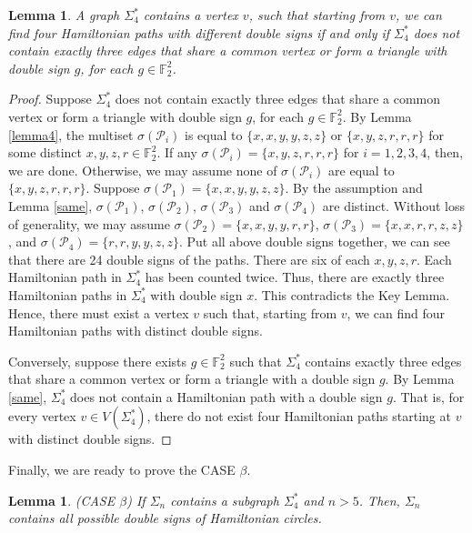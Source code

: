 \documentclass[12pt]{amsart}
\theoremstyle{plain}
\newtheorem{lemma}[theorem]{Lemma}
\theoremstyle{definition}%
\begin{document}
\begin{lemma}\label{thm11}
A graph $\Sigma_4^*$  contains a vertex $v$, such that starting from $v$, we can find four Hamiltonian paths with different double signs if and only if $\Sigma_4^*$ does not contain exactly three edges that share a common vertex or form a triangle with double sign $g$, for each $g\in \mathbb{F}_2^2$.
\end{lemma}
 \begin{proof} Suppose $\Sigma_4^*$ does not contain exactly three edges that share a common vertex or form a triangle with double sign $g$, for each $g\in \mathbb{F}_2^2$. By Lemma \ref{lemma4}, the multiset  $\sigma(\mathscr{P}_i)$  is equal to $\{x,x,y,y,z,z\}$ or $\{x,y,z,r,r,r\}$ for some distinct $x,y,z,r\in \mathbb{F}_2^2$. If any $\sigma(\mathscr{P}_i)=\{x,y,z,r,r,r\}$ for $i=1,2,3,4$, then, we are done. Otherwise, we may assume none of $\sigma(\mathscr{P}_i)$ are equal to $\{x,y,z,r,r,r\}$. Suppose $\sigma(\mathscr{P}_1)=\{x,x,y,y,z,z\}$. By the assumption and Lemma \ref{same}, $\sigma(\mathscr{P}_1)$, $\sigma(\mathscr{P}_2)$, $\sigma(\mathscr{P}_3)$ and $\sigma(\mathscr{P}_4)$ are distinct. Without loss of generality, we may assume $\sigma(\mathscr{P}_2)=\{x,x,y,y,r,r\}$, $\sigma(\mathscr{P}_3)=\{x,x,r,r,z,z\}$, and $\sigma(\mathscr{P}_4)=\{r,r,y,y,z,z\}$. Put all above double signs together, we can see that there are 24 double signs of the paths. There are six of each $x,y,z,r$.  Each Hamiltonian path in \(\Sigma_4^*\) has been counted twice. Thus, there are exactly three Hamiltonian paths in \(\Sigma_4^*\) with double sign \(x\). This contradicts the Key Lemma. Hence, there must exist a vertex \(v\) such that, starting from \(v\), we can find four Hamiltonian paths with distinct double signs.


Conversely, suppose there exists
 $g \in \mathbb{F}_2^2$  such that  $\Sigma_4^*$  contains exactly three edges that share a common vertex or form a triangle with a double sign  $g$. By Lemma \ref{same}, $\Sigma_4^*$ does not contain a Hamiltonian path with a double sign $g$. That is, for every vertex \(v \in V(\Sigma_4^*)\), there do not exist four Hamiltonian paths starting at \(v\) with distinct double signs.
\end{proof}
 
Finally, we are ready to prove the CASE $\beta$. 

\begin{lemma} (CASE $\beta$)  If $\Sigma_n$ contains a  subgraph $\Sigma_4^*$ and $n>5$. Then,  $\Sigma_n$  contains all possible double signs of Hamiltonian circles.
\end{lemma}
\end{document}
